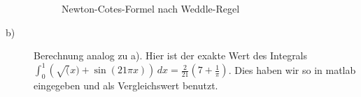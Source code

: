 \documentclass[11pt,a4paper,ngerman]{article}
\begin{document}
\begin{description}
\begin{figure}[ht]
\centering
{}
\caption{Newton-Cotes-Formel nach Weddle-Regel}
\end{figure}

\newpage

\item[b)] Berechnung analog zu a). Hier ist der exakte Wert des Integrals $\int_0^1 \left( \sqrt(x) + \sin(21\pi x)\right) \, dx = \frac{2}{21} \left(7 + \frac{1}{\pi} \right)$. Dies haben wir so in matlab eingegeben und als Vergleichswert benutzt.


\end{description}
\end{document}
